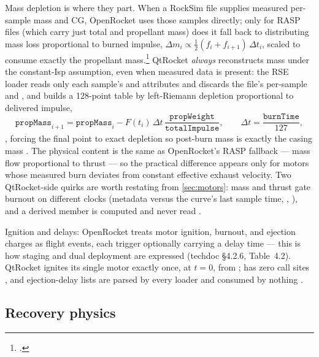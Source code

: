 Mass depletion is where they part. When a RockSim  file supplies measured
per-sample mass and CG, OpenRocket uses those samples directly; only for RASP 
files (which carry just total and propellant mass) does it fall back to distributing mass
loss proportional to burned impulse,
$\Delta m_i \propto \tfrac12 (f_i + f_{i+1})\,\Delta t_i$, scaled to consume exactly the
propellant mass.\footnote{.} QtRocket
\emph{always} reconstructs mass under the constant-Isp assumption, even when measured data
is present: the RSE loader reads only each sample's  and  attributes and
discards the file's per-sample  and  ,
and  builds a 128-point table  by
left-Riemann depletion proportional to delivered impulse,
\begin{equation}
\mathtt{propMass}_{i+1} = \mathtt{propMass}_i
- F(t_i)\,\Delta t\,\frac{\mathtt{propWeight}}{\mathtt{totalImpulse}},
\qquad \Delta t = \frac{\mathtt{burnTime}}{127},
\end{equation}
, forcing the final point to exact depletion so post-burn
mass is exactly the casing mass . The physical content is the
same as OpenRocket's RASP fallback --- mass flow proportional to thrust --- so the practical
difference appears only for motors whose measured burn deviates from constant effective
exhaust velocity. Two QtRocket-side quirks are worth restating from \cref{sec:motors}: mass
and thrust gate burnout on different clocks (metadata  versus the curve's
last sample time, , ), and a
derived  member is computed and never read .

Ignition and delays: OpenRocket treats motor ignition, burnout, and ejection charges as
flight events, each trigger optionally carrying a delay time --- this is how staging and
dual deployment are expressed (techdoc \S 4.2.6, Table~4.2). QtRocket ignites its single
motor exactly once, at $t = 0$, from 
;  has zero call sites
, and ejection-delay lists are parsed by every loader and
consumed by nothing .

\subsection{Recovery physics}\label{app:or-methods-recovery}

